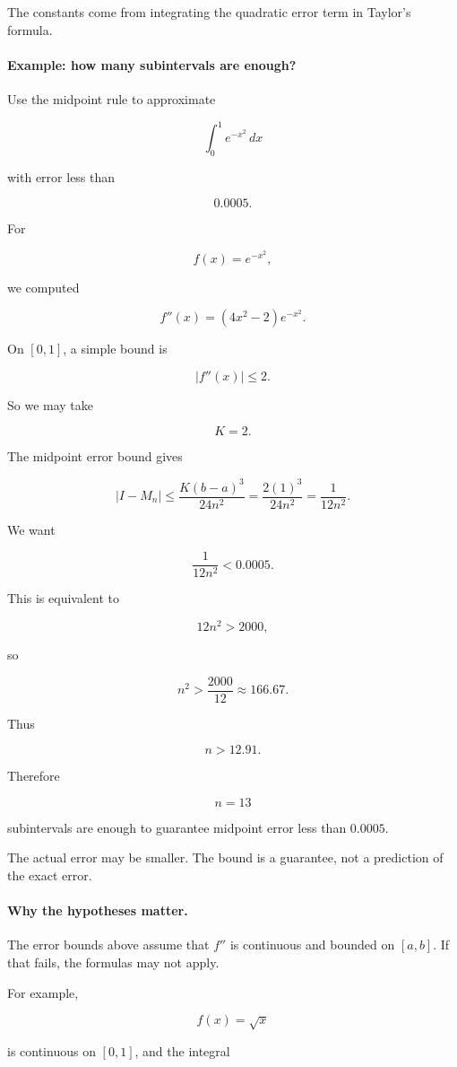 The constants come from integrating the quadratic error term in Taylor's formula.

\paragraph{Example: how many subintervals are enough?}
Use the midpoint rule to approximate

\[
\int_0^1 e^{-x^2}\,dx
\]

with error less than

\[
0.0005.
\]

For

\[
f(x)=e^{-x^2},
\]

we computed

\[
f''(x)=(4x^2-2)e^{-x^2}.
\]

On \([0,1]\), a simple bound is

\[
|f''(x)|\le 2.
\]

So we may take

\[
K=2.
\]

The midpoint error bound gives

\[
|I-M_n|
\le
\frac{K(b-a)^3}{24n^2}
=
\frac{2(1)^3}{24n^2}
=
\frac{1}{12n^2}.
\]

We want

\[
\frac{1}{12n^2}<0.0005.
\]

This is equivalent to

\[
12n^2>2000,
\]

so

\[
n^2>\frac{2000}{12}\approx 166.67.
\]

Thus

\[
n>12.91.
\]

Therefore

\[
\boxed{
n=13
}
\]

subintervals are enough to guarantee midpoint error less than \(0.0005\).

The actual error may be smaller.  The bound is a guarantee, not a prediction of the exact
error.

\paragraph{Why the hypotheses matter.}
The error bounds above assume that \(f''\) is continuous and bounded on \([a,b]\).  If
that fails, the formulas may not apply.

For example,

\[
f(x)=\sqrt{x}
\]

is continuous on \([0,1]\), and the integral

